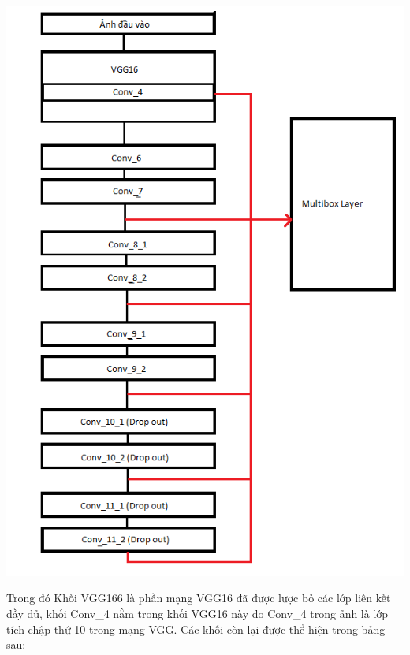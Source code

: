 \documentclass[a4paper]{article}
\theoremstyle{definition}
\begin{document}
	\begin{center}
		
		\centering
		\includegraphics[width=0.8\linewidth]{SSD_Layers.png}
		\vspace{0.5cm}
	\end{center}
	
	Trong đó Khối VGG166 là phần mạng VGG16\cite{simonyan2014very} đã được lược bỏ các lớp liên kết đầy đủ, khối Conv\_4 nằm trong khối VGG16 này do Conv\_4 trong ảnh là lớp tích chập thứ 10 trong mạng VGG\cite{simonyan2014very}. Các khối còn lại được thể hiện trong bảng sau:
	
\end{document}
